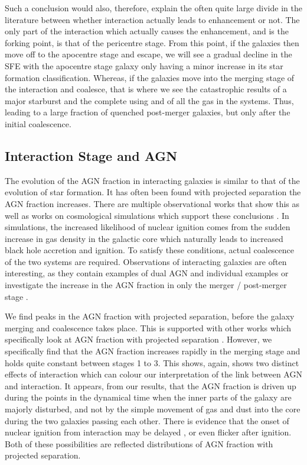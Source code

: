 Such a conclusion would also, therefore, explain the often quite large divide in the literature between whether interaction actually leads to enhancement or not. The only part of the interaction which actually causes the enhancement, and is the forking point, is that of the pericentre stage. From this point, if the galaxies then move off to the apocentre stage and escape, we will see a gradual decline in the SFE with the apocentre stage galaxy only having a minor increase in its star formation classification. Whereas, if the galaxies move into the merging stage of the interaction and coalesce, that is where we see the catastrophic results of a major starburst and the complete using and of all the gas in the systems. Thus, leading to a large fraction of quenched post-merger galaxies, but only after the initial coalescence. 

\subsection{Interaction Stage and AGN}
\noindent The evolution of the AGN fraction in interacting galaxies is similar to that of the evolution of star formation. It has often been found with projected separation the AGN fraction increases. There are multiple observational works that show this \citep{2007MNRAS.375.1017A, 2013MNRAS.435.3627E, 2020ApJ...904..107S} as well as works on cosmological simulations which support these conclusions \citep{2023MNRAS.519.4966B}. In simulations, the increased likelihood of nuclear ignition comes from the sudden increase in gas density in the galactic core which naturally leads to increased black hole accretion and ignition. To satisfy these conditions, actual coalescence of the two systems are required. Observations of interacting galaxies are often interesting, as they contain examples of dual AGN and individual examples \citep[e.g.][]{2017MNRAS.470L..49E, 2021ApJ...923...36S} or investigate the increase in the AGN fraction in only the merger / post-merger stage \citep{2020A&A...637A..94G}.

We find peaks in the AGN fraction with projected separation, before the galaxy merging and coalescence takes place. This is supported with other works which specifically look at AGN fraction with projected separation \citep{2011MNRAS.418.2043E, 2023ApJ...942..107S}. However, we specifically find that the AGN fraction increases rapidly in the merging stage and holds quite constant between stages 1 to 3. This shows, again, shows two distinct effects of interaction which can colour our interpretation of the link between AGN and interaction. It appears, from our results, that the AGN fraction is driven up during the points in the dynamical time when the inner parts of the galaxy are majorly disturbed, and not by the simple movement of gas and dust into the core during the two galaxies passing each other. There is evidence that the onset of nuclear ignition from interaction may be delayed \citep{2011MNRAS.418.2043E}, or even flicker \citep{2015MNRAS.451.2517S} after ignition. Both of these possibilities are reflected distributions of AGN fraction with projected separation.

